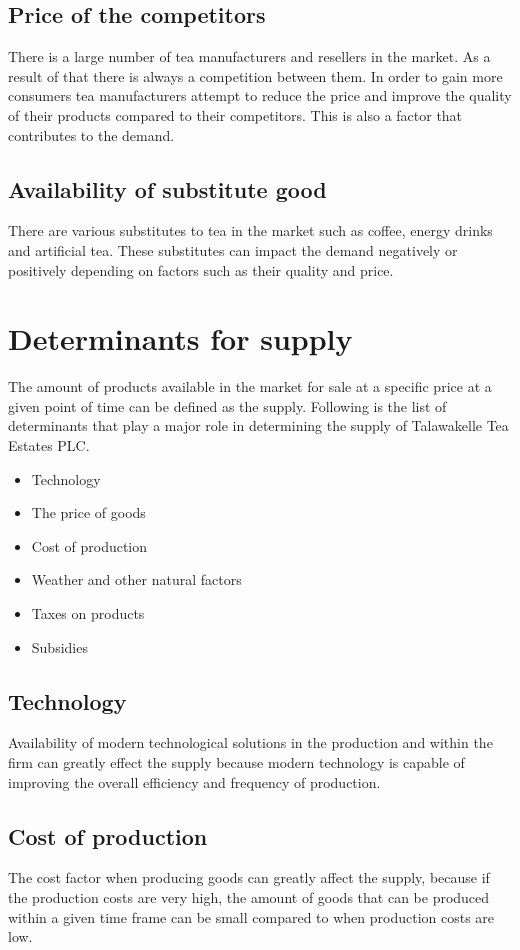 \documentclass[12pt]{report}
\begin{document}
\subsection{Price of the competitors}
There is a large number of tea manufacturers and resellers in the market. As a result of that there is always a competition between them. In order to gain more consumers tea manufacturers attempt to reduce the price and improve the quality of their products compared to their competitors. This is also a factor that contributes to the demand.

\subsection{Availability of substitute good}
There are various substitutes to tea in the market such as coffee, energy drinks and artificial tea. These substitutes can impact the demand negatively or positively depending on factors such as their quality and price.

\section{Determinants for supply}
The amount of products available in the market for sale at a specific price at a given point of time can be defined as the supply. Following is the list of determinants that play a major role in determining the supply of Talawakelle Tea Estates PLC.

\begin{itemize}
	\item {Technology}
	\item {The price of goods}
	\item {Cost of production}
	\item {Weather and other natural factors}
	\item {Taxes on products}
	\item {Subsidies}
\end{itemize}

\subsection{Technology}
Availability of modern technological solutions in the production and within the firm can greatly effect the supply because modern technology is capable of improving the overall efficiency and frequency of production.

\subsection{Cost of production}
The cost factor when producing goods can greatly affect the supply, because if the production costs are very high, the amount of goods that can be produced within a given time frame can be small compared to when production costs are low.
\end{document}
